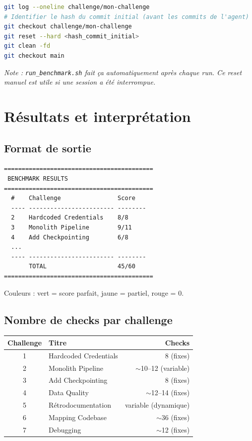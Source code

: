 \documentclass[11pt,a4paper]{article}
\newcommand{\code}[1]{\texttt{#1}}
\begin{document}
\begin{lstlisting}[language=bash]
git log --oneline challenge/mon-challenge
# Identifier le hash du commit initial (avant les commits de l'agent)
git checkout challenge/mon-challenge
git reset --hard <hash_commit_initial>
git clean -fd
git checkout main
\end{lstlisting}

\textit{Note : \code{run\_benchmark.sh} fait ça automatiquement après chaque run.
Ce reset manuel est utile si une session a été interrompue.}

\section{Résultats et interprétation}

\subsection{Format de sortie}

\begin{lstlisting}
==========================================
 BENCHMARK RESULTS
==========================================
  #    Challenge                Score
  ---- ------------------------ --------
  2    Hardcoded Credentials    8/8
  3    Monolith Pipeline        9/11
  4    Add Checkpointing        6/8
  ...
  ---- ------------------------ --------
       TOTAL                    45/60
==========================================
\end{lstlisting}

Couleurs : vert = score parfait, jaune = partiel, rouge = 0.

\subsection{Nombre de checks par challenge}

\begin{center}
\begin{tabular}{clr}
  \toprule
  Challenge & Titre & Checks \\
  \midrule
  1 & Hardcoded Credentials     & 8 (fixes) \\
  2 & Monolith Pipeline         & $\sim$10--12 (variable) \\
  3 & Add Checkpointing         & 8 (fixes) \\
  4 & Data Quality              & $\sim$12--14 (fixes) \\
  5 & Rétrodocumentation        & variable (dynamique) \\
  6 & Mapping Codebase          & $\sim$36 (fixes) \\
  7 & Debugging                 & $\sim$12 (fixes) \\
  \bottomrule
\end{tabular}
\end{center}
\end{document}
